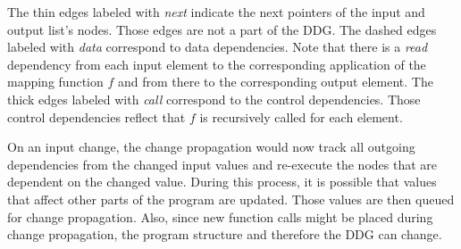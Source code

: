 The thin edges labeled with \textit{next} indicate the next pointers of the input and output list's nodes. Those edges are not a part of the DDG. The dashed edges labeled with \textit{data} correspond to data dependencies. Note that there is a \textit{read} dependency from each input element to the corresponding application of the mapping function $f$ and from there to the corresponding output element. The thick edges labeled with \textit{call} correspond to the control dependencies. Those control dependencies reflect that $f$ is recursively called for each element. 

On an input change, the change propagation would now track all outgoing dependencies from the changed input values and re-execute the nodes that are dependent on the changed value. During this process, it is possible that values that affect other parts of the program are updated. Those values are then queued for change propagation. Also, since new function calls might be placed during change propagation, the program structure and therefore the DDG can change.  

